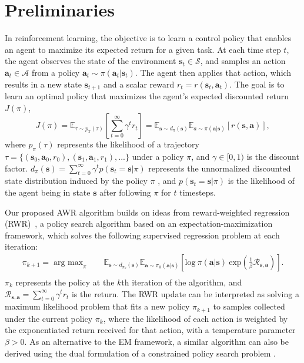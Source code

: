 \documentclass{article} \usepackage{iclr2020_conference,times}
\def\rva{{\mathbf{a}}}
\def\rvs{{\mathbf{s}}}
\newcommand{\E}{\mathbb{E}}
\newcommand{\expec}{\mathbb{E}}
\begin{document}
\section{Preliminaries}

In reinforcement learning, the objective is to learn a control policy that enables an agent to maximize its expected return for a given task. At each time step $t$, the agent observes the state of the environment $\rvs_t \in \mathcal{S}$, and samples an action $\rva_t \in \mathcal{A}$ from a policy $\rva_t \sim \pi(\rva_t|\rvs_t)$. The agent then applies that action, which results in a new state $\rvs_{t+1}$ and a scalar reward $r_t = r(\rvs_t, \rva_t)$. The goal is to learn an optimal policy that maximizes the agent's expected discounted return $J(\pi)$,
\begin{equation}
     J(\pi) = \expec_{\tau \sim p_\pi(\tau)}\left[\sum_{t=0}^\infty \gamma^t r_t \right] = \expec_{\rvs \sim d_\pi(\rvs)} \expec_{a \sim \pi(\rva|\rvs)} \left[ r(\rvs, \rva)\right],
     \label{eqn:RLObjective}
 \end{equation}
where $p_\pi(\tau)$ represents the likelihood of a trajectory $\tau = \{\left(\rvs_0, \rva_0, r_0 \right), \left(\rvs_1, \rva_1, r_1 \right), ... \}$ under a policy $\pi$, and $\gamma \in [0, 1)$ is the discount factor. $d_\pi(\rvs) = \sum_{t=0}^\infty \gamma^t p(\rvs_t = \rvs | \pi)$ represents the unnormalized discounted state distribution induced by the policy $\pi$ \citep{Sutton1998}, and $p(\rvs_t = \rvs | \pi)$ is the likelihood of the agent being in state $\rvs$ after following $\pi$ for $t$ timesteps.

Our proposed AWR algorithm builds on ideas from reward-weighted regression (RWR)~\citep{Peters2010REP}, a policy search algorithm based on an expectation-maximization framework, which solves the following supervised regression problem at each iteration:
\begin{equation}
\begin{aligned}
    \pi_{k+1} = \mathop{\mathrm{arg \ max}}_{\pi} \quad & \E_{\rvs \sim d_{\pi_k}(\rvs)} \E_{\rva \sim \pi_{k}(\rva|\rvs)} \left[ \mathrm{log} \ \pi(\rva | \rvs) \ \mathrm{exp}\left( \frac{1}{\beta} \mathcal{R}_{\rvs,\rva} \right)\right] .\\
\end{aligned}
\label{eqn:RWR}
\end{equation}
$\pi_k$ represents the policy at the $k$th iteration of the algorithm, and $\mathcal{R}_{\rvs,\rva} = \sum_{t=0}^\infty \gamma^t r_t$ is the return. The RWR update can be interpreted as solving a maximum likelihood problem that fits a new policy $\pi_{k+1}$ to samples collected under the current policy $\pi_k$, where the likelihood of each action is weighted by the exponentiated return received for that action, with a temperature parameter $\beta >0$.
As an alternative to the EM framework, a similar algorithm can also be derived using the dual formulation of a constrained policy search problem \citep{Peters2010REP}.
\end{document}
